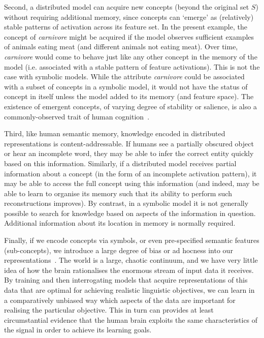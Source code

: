 Second, a distributed model can acquire new concepts (beyond the original set \(S\)) without requiring additional memory, since concepts can `emerge' as (relatively) stable patterns of activation across its feature set. In the present example, the concept of \emph{carnivore} might be acquired if the model observes sufficient examples of animals eating meat (and different animals not eating meat). Over time, \emph{carnivore} would come to behave just like any other concept in the memory of the model (i.e. associated with a stable pattern of feature activations). This is not the case with symbolic models. While the attribute \emph{carnivore} could be associated with a subset of concepts in a symbolic model, it would not have the status of concept in itself unless the model added to its memory (and feature space). The existence of emergent concepts, of varying degree of stability or salience, is also a commonly-observed trait of human cognition~\citep{patterson2007you}. 

Third, like human semantic memory, knowledge encoded in distributed representations is content-addressable. If humans see a partially obscured object or hear an incomplete word, they may be able to infer the correct entity quickly based on this information. Similarly, if a distributed model receives partial information about a concept (in the form of an incomplete activation pattern), it may be able to access the full concept using this information (and indeed, may be able to learn to organise its memory such that its ability to perform such reconstructions improves). By contrast, in a symbolic model it is not generally possible to search for knowledge based on aspects of the information in question. Additional information about its location in memory is normally required. 

Finally, if we encode concepts via symbols, or even pre-specified semantic features (sub-concepts), we introduce a large degree of bias or ad hocness into our representations~\citep{miikkulainen1991natural}. The world is a large, chaotic continuum, and we have very little idea of how the brain rationalises the enormous stream of input data it receives. By training and then interrogating models that acquire representations of this data that are optimal for achieving realistic linguistic objectives, we can learn in a comparatively unbiased way which aspects of the data are important for realising the particular objective. This in turn can provides at least circumstantial evidence that the human brain exploits the same characteristics of the signal in order to achieve its learning goals.     

